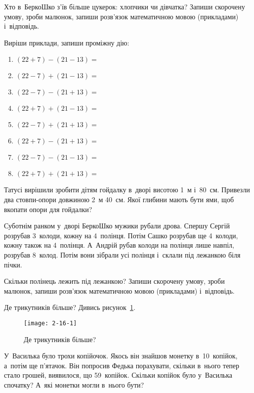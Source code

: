 Хто в~БеркоШко з’їв більше цукерок: хлопчики чи дівчатка?
Запиши скорочену умову, зроби малюнок, запиши розв’язок
математичною мовою (прикладами) і~відповідь.


\problem
Виріши приклади, запиши проміжну дію:
\begin{multicols}{2}
  \begin{enumerate}
    \item $(22 + 7) - (21 - 13) =$
    \item $(22 - 7) + (21 - 13) =$
    \item $(22 - 7) - (21 + 13) =$
    \item $(22 + 7) + (21 - 13) =$
    \item $(22 - 7) + (21 + 13) =$
    \item $(22 + 7) - (21 + 13) =$
    \item $(22 - 7) - (21 - 13) =$
    \item $(22 + 7) + (21 + 13) =$
  \end{enumerate}
\end{multicols}


\problem
Татусі вирішили зробити дітям гойдалку в~дворі висотою 1~м і~80~см.
Привезли два стовпи-опори довжиною 2~м 40~см.
Якої глибини мають бути ями, щоб вкопати опори для гойдалки?


\problem
Суботнім ранком у~дворі БеркоШко мужики рубали дрова.
Спершу Сергій розрубав 3~колоди, кожну на 4~полінця.
Потім Сашко розрубав ще 4~колоди, кожну також на 4~полінця.
А~Андрій рубав колоди на полінця лише навпіл, розрубав 8~колод.
Потім вони зібрали усі полінця і~склали під лежанкою біля пічки.

Скільки полінець лежить під лежанкою?
Запиши скорочену умову, зроби малюнок,
запиши розв’язок математичною мовою (прикладами) і~відповідь.


\problem
Де трикутників більше? Дивись рисунок~\ref{fig:how-many-triangles}.

\begin{figure}[ht]
  \centering
  \texttt{[image: 2-16-1]}
  \caption{Де трикутників більше?}
  \label{fig:how-many-triangles}
\end{figure}


\problem
У~Василька було трохи копійочок.
Якось він знайшов монетку в~10~копійок, а~потім ще п’ятачок.
Він попросив Федька порахувати, скільки в~нього тепер стало грошей,
виявилося, що 59~копійок.
Скільки копійок було у~Василька спочатку?
А~які монетки могли в~нього бути?


